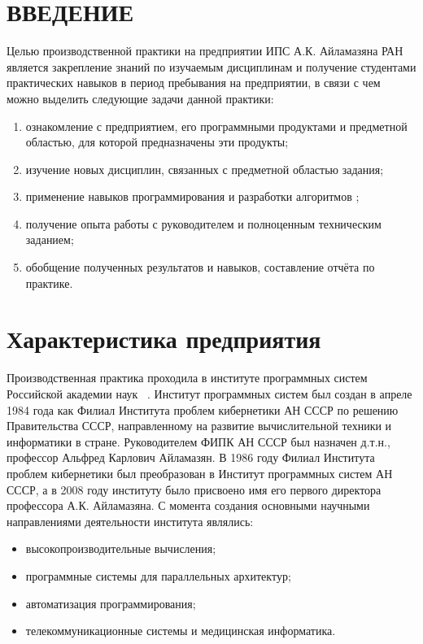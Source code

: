 \documentclass[14pt, russian]{scrartcl}
\newcommand{\anonsection}[1]{\cleardoublepage
\phantomsection
\addcontentsline{toc}{section}{\protect\numberline{}#1}
\section*{#1}\vspace*{2.5ex} %
}
\begin{document}
\newpage
\renewcommand\contentsname{\hfill{\normalfont{СОДЕРЖАНИЕ}}\hfill}  %
\tableofcontents
\newpage

\anonsection{ВВЕДЕНИЕ}  %
Целью производственной практики на предприятии ИПС А.К. Айламазяна РАН является закрепление знаний по изучаемым дисциплинам 
и получение студентами практических навыков в период пребывания на предприятии, 
в связи с чем можно выделить следующие задачи данной практики:

\begin{enumerate}
  \item ознакомление с предприятием, его программными продуктами и предметной областью,
  для которой предназначены эти продукты;
  \item изучение новых дисциплин, связанных с предметной областью задания;
  \item применение навыков программирования и разработки алгоритмов ;
  \item получение опыта работы с руководителем и полноценным техническим заданием;
  \item обобщение полученных результатов и навыков, составление отчёта по практике.
\end{enumerate}

\section{Характеристика предприятия}
Производственная практика проходила в институте программных систем Российской академии наук ~\cite{IPS}.
Институт программных систем  был создан в апреле 1984 года как Филиал Института проблем кибернетики АН СССР по решению Правительства СССР, направленному на развитие вычислительной техники и информатики в стране. Руководителем ФИПК АН СССР был назначен д.т.н., профессор Альфред Карлович Айламазян. В 1986 году Филиал Института проблем кибернетики был преобразован в Институт программных систем АН СССР, а в 2008 году институту было присвоено имя его первого директора профессора А.К. Айламазяна.
С момента создания основными научными направлениями деятельности  института являлись:
\begin{itemize}
\item высокопроизводительные вычисления;
\item программные системы для параллельных архитектур;
\item автоматизация программирования;
\item телекоммуникационные системы и медицинская информатика.
\end{itemize}
\end{document}
